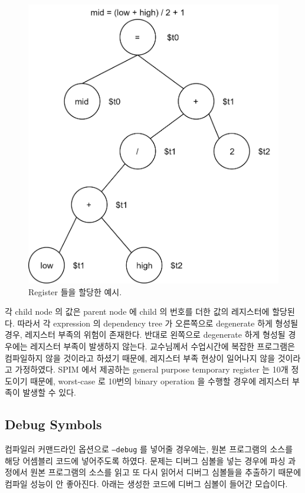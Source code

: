 \documentclass[a4paper,12p]{paper}
\def\code#1{\texttt{#1}}
\begin{document}
\begin{figure}[ht]
  \centering
\includegraphics[scale=0.1]{figs/register.png}
\caption{Register 들을 할당한 예시.}\label{fig:reg}
\end{figure}

각 child node 의 값은 parent node 에 child 의 번호를 더한 값의 레지스터에 할당된다. 따라서 각 expression 의 dependency tree 가 오른쪽으로 degenerate 하게 형성될 경우, 레지스터 부족의 위험이 존재한다. 반대로 왼쪽으로 degenerate 하게 형성될 경우에는 레지스터 부족이 발생하지 않는다. 교수님께서 수업시간에 복잡한 프로그램은 컴파일하지 않을 것이라고 하셨기 때문에, 레지스터 부족 현상이 일어나지 않을 것이라고 가정하였다. SPIM 에서 제공하는 general purpose temporary register 는 10개 정도이기 때문에, worst-case 로 10번의 binary operation 을 수행할 경우에 레지스터 부족이 발생할 수 있다. 

\subsection{Debug Symbols}
컴파일러 커맨드라인 옵션으로 \code{--debug} 를 넣어줄 경우에는, 원본 프로그램의 소스를 해당 어셈블리 코드에 넣어주도록 하였다. 문제는 디버그 심볼을 넣는 경우에 파싱 과정에서 원본 프로그램의 소스를 읽고 또 다시 읽어서 디버그 심볼들을 추출하기 때문에 컴파일 성능이 안 좋아진다. 아래는 생성한 코드에 디버그 심볼이 들어간 모습이다.
\end{document}
